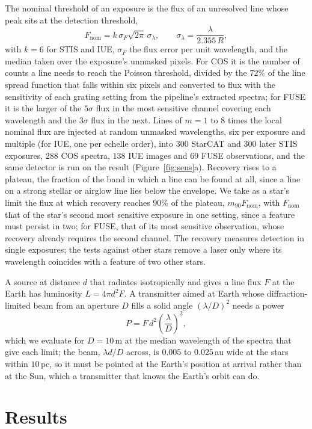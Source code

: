 \documentclass[3p,11pt]{elsarticle}
\begin{document}
The nominal threshold of an exposure is the flux of an unresolved line whose peak sits
at the detection threshold,
\[
F_{\mathrm{nom}}=k\,\sigma_F\sqrt{2\pi}\,\sigma_\lambda,\qquad
\sigma_\lambda=\frac{\lambda}{2.355\,R},
\]
with $k=6$ for STIS and IUE, $\sigma_F$ the flux error per unit wavelength, and the
median taken over the exposure's unmasked pixels. For COS it is the number of counts a
line needs to reach the Poisson threshold, divided by the $72\%$ of the line spread
function that falls within six pixels and converted to flux with the sensitivity of each
grating setting from the pipeline's extracted spectra; for FUSE it is the larger of the
$5\sigma$ flux in the most sensitive channel covering each wavelength and the $3\sigma$
flux in the next. Lines of $m=1$ to $8$ times the local nominal flux are injected at
random unmasked wavelengths, six per exposure and multiple (for IUE, one per echelle
order), into $300$ StarCAT and $300$ later STIS exposures, $288$ COS
spectra, $138$ IUE images and $69$ FUSE observations, and the same detector is run on
the result (Figure~\ref{fig:sens}a). Recovery rises to a plateau, the fraction of the
band in which a line can be found at all, since a line on a strong stellar or airglow
line lies below the envelope. We take as a star's limit the flux at which recovery
reaches $90\%$ of the plateau, $m_{90}F_{\mathrm{nom}}$, with $F_{\mathrm{nom}}$ that of
the star's second most sensitive exposure in one setting, since a feature must persist
in two; for FUSE, that of its most sensitive observation, whose recovery already
requires the second channel. The recovery measures detection in single exposures; the
tests against other stars remove a laser only where its wavelength coincides with a
feature of two other stars.

A source at distance $d$ that radiates isotropically and gives a line flux $F$ at the
Earth has luminosity $L=4\pi d^2F$. A transmitter aimed at Earth whose diffraction-limited
beam from an aperture $D$ fills a solid angle $(\lambda/D)^2$ needs a power
\[
P=F\,d^2\left(\frac{\lambda}{D}\right)^2,
\]
which we evaluate for $D=10$\,m at the median wavelength of the spectra that give each
limit; the beam, $\lambda d/D$ across, is $0.005$ to $0.025$\,au wide at the stars
within $10$\,pc, so it must be pointed at the Earth's position at arrival rather than at
the Sun, which a transmitter that knows the Earth's orbit can do.

\section{Results}\label{sec:results}
\end{document}
